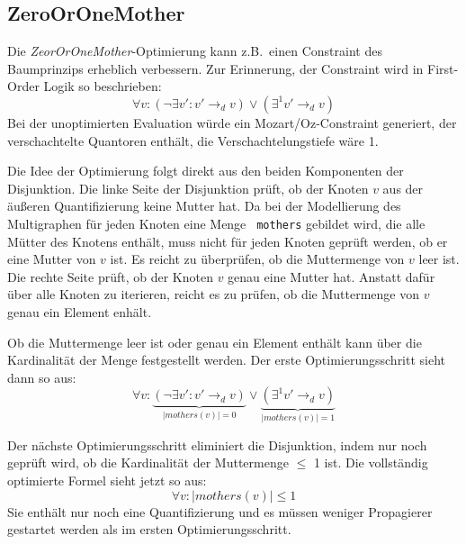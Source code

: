 \subsection{ZeroOrOneMother}

Die {\it ZeorOrOneMother}-Optimierung kann z.B.\ einen Constraint des
Baumprinzips erheblich verbessern. Zur Erinnerung, der Constraint wird
in First-Order Logik so beschrieben:
$$\forall v:(\neg \exists v' : v' \rightarrow_d v) \vee
(\exists^1 v' \rightarrow_d v)$$ 
Bei der unoptimierten Evaluation w\"urde ein Mozart/Oz-Constraint
generiert, der verschachtelte Quantoren enth\"alt, die
Verschachtelungstiefe w\"are 1.

Die Idee der Optimierung folgt direkt aus den beiden Komponenten der
Disjunktion. Die linke Seite der Disjunktion pr\"uft, ob der Knoten
$v$ aus der \"au{\ss}eren Quantifizierung keine Mutter hat. Da bei der
Modellierung des Multigraphen f\"ur jeden Knoten eine Menge {\tt
  mothers} gebildet wird, die alle M\"utter des Knotens enth\"alt,
muss nicht f\"ur jeden Knoten gepr\"uft werden, ob er eine Mutter von
$v$ ist. Es reicht zu \"uberpr\"ufen, ob die Muttermenge von $v$ leer
ist. Die rechte Seite pr\"uft, ob der Knoten $v$ genau eine Mutter
hat. Anstatt daf\"ur \"uber alle Knoten zu iterieren, reicht es zu
pr\"ufen, ob die Muttermenge von $v$ genau ein Element enh\"alt.

Ob die Muttermenge leer ist oder genau ein Element enth\"alt kann
\"uber die Kardinalit\"at der Menge festgestellt werden. Der erste
Optimierungsschritt sieht dann so aus:
$$\forall v: \underbrace{(\neg \exists v' : v' \rightarrow_d v)
}_{|\mathit{mothers(v)}| = 0}\vee
\underbrace{(\exists^1 v' \rightarrow_d v)}_{|\mathit{mothers(v)}| = 1}$$

Der n\"achste Optimierungsschritt eliminiert die Disjunktion, indem
nur noch gepr\"uft wird, ob die Kardinalit\"at der Muttermenge $\leq$
1 ist. Die vollst\"andig optimierte Formel sieht jetzt so aus:
$$\forall v: |mothers(v)| \leq 1$$
Sie enth\"alt nur noch eine Quantifizierung und es m\"ussen weniger
Propagierer gestartet werden als im ersten Optimierungsschritt.

